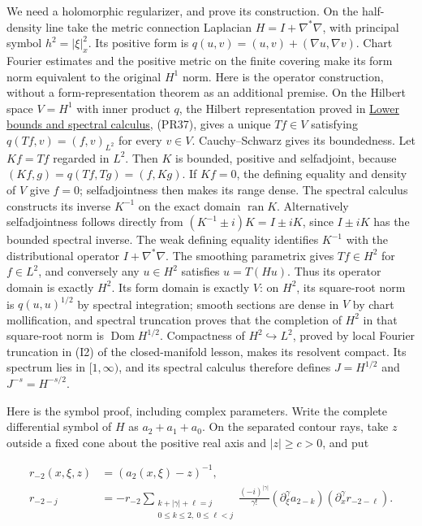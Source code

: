\documentclass[
  11pt,
]{article}
\begin{document}
We need a holomorphic regularizer, and prove its construction. On the
half-density line take the metric connection Laplacian
\(H=I+\nabla^*\nabla\), with principal symbol \(h^2=|\xi|_x^2\). Its
positive form is \(q(u,v)=(u,v)+(\nabla u,\nabla v)\). Chart Fourier
estimates and the positive metric on the finite covering make its form
norm equivalent to the original \(H^1\) norm. Here is the operator
construction, without a form-representation theorem as an additional
premise. On the Hilbert space \(V=H^1\) with inner product \(q\), the
Hilbert representation proved in
\href{lower-bounded-spectral-calculus.pdf}{Lower bounds and spectral
calculus}, (PR37), gives a unique \(Tf\in V\) satisfying
\(q(Tf,v)=(f,v)_{L^2}\) for every \(v\in V\). Cauchy--Schwarz gives its
boundedness. Let \(Kf=Tf\) regarded in \(L^2\). Then \(K\) is bounded,
positive and selfadjoint, because \((Kf,g)=q(Tf,Tg)=(f,Kg)\). If
\(Kf=0\), the defining equality and density of \(V\) give \(f=0\);
selfadjointness then makes its range dense. The spectral calculus
constructs its inverse \(K^{-1}\) on the exact domain
\(\operatorname{ran}K\). Alternatively selfadjointness follows directly
from \((K^{-1}\pm i)K=I\pm iK\), since \(I\pm iK\) has the bounded
spectral inverse. The weak defining equality identifies \(K^{-1}\) with
the distributional operator \(I+\nabla^*\nabla\). The smoothing
parametrix gives \(Tf\in H^2\) for \(f\in L^2\), and conversely any
\(u\in H^2\) satisfies \(u=T(Hu)\). Thus its operator domain is exactly
\(H^2\). Its form domain is exactly \(V\): on \(H^2\), its square-root
norm is \(q(u,u)^{1/2}\) by spectral integration; smooth sections are
dense in \(V\) by chart mollification, and spectral truncation proves
that the completion of \(H^2\) in that square-root norm is
\(\operatorname{Dom}H^{1/2}\). Compactness of
\(H^2\hookrightarrow L^2\), proved by local Fourier truncation in (I2)
of the closed-manifold lesson, makes its resolvent compact. Its spectrum
lies in \([1,\infty)\), and its spectral calculus therefore defines
\(J=H^{1/2}\) and \(J^{-s}=H^{-s/2}\).

Here is the symbol proof, including complex parameters. Write the
complete differential symbol of \(H\) as \(a_2+a_1+a_0\). On the
separated contour rays, take \(z\) outside a fixed cone about the
positive real axis and \(|z|\geq c>0\), and put

\[
 \begin{split}
 r_{-2}(x,\xi,z)&=(a_2(x,\xi)-z)^{-1},\\
 r_{-2-j}&=-r_{-2}
   \sum_{\substack{k+|\gamma|+\ell=j\\0\leq k\leq2,\ 0\leq\ell<j}}
       \frac{(-i)^{|\gamma|}}{\gamma!}
       (\partial_\xi^\gamma a_{2-k})
       (\partial_x^\gamma r_{-2-\ell}).
 \end{split}
\tag{IG6}
\]
\end{document}
